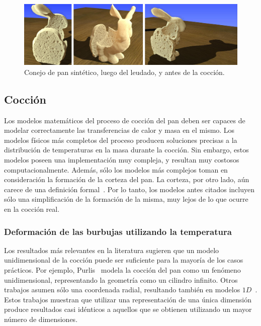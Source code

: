 \begin{figure}
\includegraphics[width=13cm]{figures/prebakebunny}
\caption{Conejo de pan sintético, luego del leudado, y antes de la cocción.}
\label{fg:provingBunny}
\end{figure}

\subsection{Cocción}
Los modelos matemáticos del proceso de cocción del pan deben ser capaces de modelar correctamente las transferencias de calor y masa en el mismo.
Los modelos físicos más completos del proceso producen soluciones precisas a la distribución de temperaturas en la masa durante la cocción.
Sin embargo, estos modelos poseen una implementación muy compleja, y resultan muy costosos computacionalmente.
Además, sólo los modelos más complejos toman en consideración la formación de la corteza del pan.
La corteza, por otro lado, aún carece de una definición formal~\cite{Vanin2009}.
Por lo tanto, los modelos antes citados incluyen sólo una simplificación de la formación de la misma, muy lejos de lo que ocurre en la cocción real.

\subsubsection{Deformación de las burbujas utilizando la temperatura}
Los resultados más relevantes en la literatura sugieren que un modelo unidimensional de la cocción puede ser suficiente para la mayoría de los casos prácticos.
Por ejemplo, Purlis~\cite{Purlis2011} modela la cocción del pan como un fenómeno unidimensional, representando la geometría como un cilindro infinito.
Otros trabajos asumen sólo una coordenada radial, resultando también en modelos $1D$~\cite{Powathil2004, Thorvaldsson1999}.
Estos trabajos muestran que utilizar una representación de una única dimensión produce resultados casi idénticos a aquellos que se obtienen utilizando un mayor número de dimensiones.

